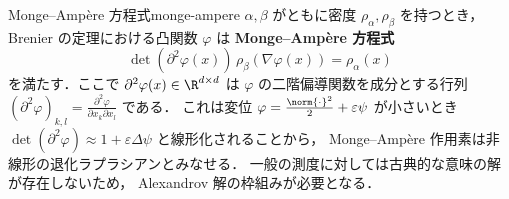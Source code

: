 \begin{remark}{Monge--Amp\`{e}re 方程式}{monge-ampere}
  $\alpha, \beta$ がともに密度 $\rho_\alpha, \rho_\beta$ を持つとき，
  Brenier の定理における凸関数 $\varphi$ は
  \textbf{Monge--Amp\`{e}re 方程式}
  \[
    \det(\partial^2 \varphi(x)) \, \rho_\beta(\nabla\varphi(x)) = \rho_\alpha(x)
  \]
  を満たす．ここで $\partial^2 \varphi(x) \in \R^{d \times d}$ は
  $\varphi$ の二階偏導関数を成分とする行列
  $(\partial^2 \varphi)_{k,l} = \frac{\partial^2 \varphi}{\partial x_k \partial x_l}$
  である．
  これは変位 $\varphi = \frac{\norm{\cdot}^2}{2} + \varepsilon\psi$ が小さいとき
  $\det(\partial^2\varphi) \approx 1 + \varepsilon\Delta\psi$ と線形化されることから，
  Monge--Amp\`{e}re 作用素は非線形の退化ラプラシアンとみなせる．
  一般の測度に対しては古典的な意味の解が存在しないため，
  Alexandrov 解の枠組みが必要となる．
\end{remark}

